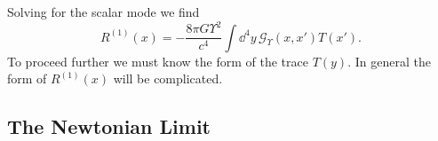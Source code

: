 Solving for the scalar mode we find
\begin{equation}
R^{(1)}(x) = -\frac{8 \pi G \Upsilon^2}{c^4}\int \dd^4 y\, \mathscr{G}_\Upsilon(x, x') T(x').
\end{equation}
To proceed further we must know the form of the trace $T(y)$. In general the form of $R^{(1)}(x)$ will be complicated.


\subsection{The Newtonian Limit}

